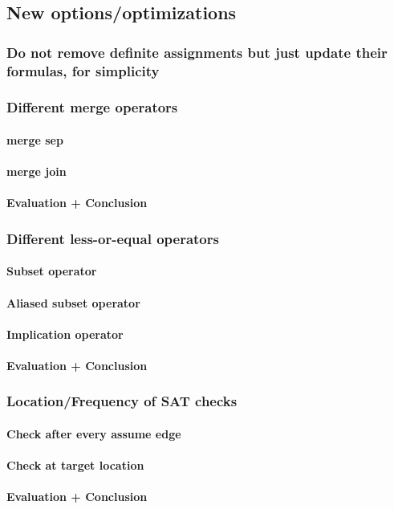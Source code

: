 \subsection{New options/optimizations}
\subsubsection{Do not remove definite assignments but just update their formulas, for simplicity}
\subsubsection{Different merge operators}
\paragraph{merge sep}
\paragraph{merge join}
\paragraph{Evaluation + Conclusion}
\subsubsection{Different less-or-equal operators}
\paragraph{Subset operator}
\paragraph{Aliased subset operator}
\paragraph{Implication operator}
\paragraph{Evaluation + Conclusion}
\subsubsection{Location/Frequency of SAT checks}
\paragraph{Check after every assume edge}
\paragraph{Check at target location}
\paragraph{Evaluation + Conclusion}
